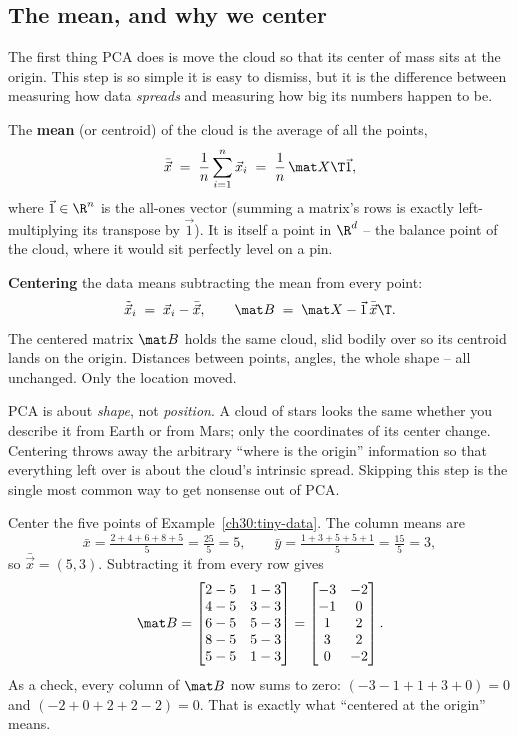 \subsection{The mean, and why we center}

The first thing PCA does is move the cloud so that its center of mass sits at the
origin. This step is so simple it is easy to dismiss, but it is the difference
between measuring how data \emph{spreads} and measuring how big its numbers happen
to be.

The \textbf{mean} (or centroid) of the cloud is the average of all the points,
\[
  \bar{\vec x} \;=\; \frac{1}{n}\sum_{i=1}^{n}\vec x_i
  \;=\;\frac{1}{n}\,\mat X\T\vec 1,
\]
where $\vec 1\in\R^n$ is the all-ones vector (summing a matrix's rows is exactly
left-multiplying its transpose by $\vec 1$). It is itself a point in $\R^d$ -- the
balance point of the cloud, where it would sit perfectly level on a pin.

\textbf{Centering} the data means subtracting the mean from every point:
\[
  \tilde{\vec x}_i \;=\; \vec x_i - \bar{\vec x},
  \qquad
  \mat B \;=\; \mat X - \vec 1\,\bar{\vec x}\T.
\]
The centered matrix $\mat B$ holds the same cloud, slid bodily over so its centroid
lands on the origin. Distances between points, angles, the whole shape -- all
unchanged. Only the location moved.

\begin{intuitionbox}
PCA is about \emph{shape}, not \emph{position}. A cloud of stars looks the same
whether you describe it from Earth or from Mars; only the coordinates of its center
change. Centering throws away the arbitrary ``where is the origin'' information so
that everything left over is about the cloud's intrinsic spread. Skipping this step
is the single most common way to get nonsense out of PCA.
\end{intuitionbox}

\begin{example}\label{ch30:center-it}
Center the five points of Example~\ref{ch30:tiny-data}. The column means are
\[
  \bar x = \tfrac{2+4+6+8+5}{5} = \tfrac{25}{5} = 5,
  \qquad
  \bar y = \tfrac{1+3+5+5+1}{5} = \tfrac{15}{5} = 3,
\]
so $\bar{\vec x}=(5,3)$. Subtracting it from every row gives
\[
  \mat B =
  \begin{bmatrix}
    2-5 & 1-3\\
    4-5 & 3-3\\
    6-5 & 5-3\\
    8-5 & 5-3\\
    5-5 & 1-3
  \end{bmatrix}
  =
  \begin{bmatrix}
    -3 & -2\\
    -1 & 0\\
    1 & 2\\
    3 & 2\\
    0 & -2
  \end{bmatrix}.
\]
As a check, every column of $\mat B$ now sums to zero: $(-3-1+1+3+0)=0$ and
$(-2+0+2+2-2)=0$. That is exactly what ``centered at the origin'' means.
\end{example}

